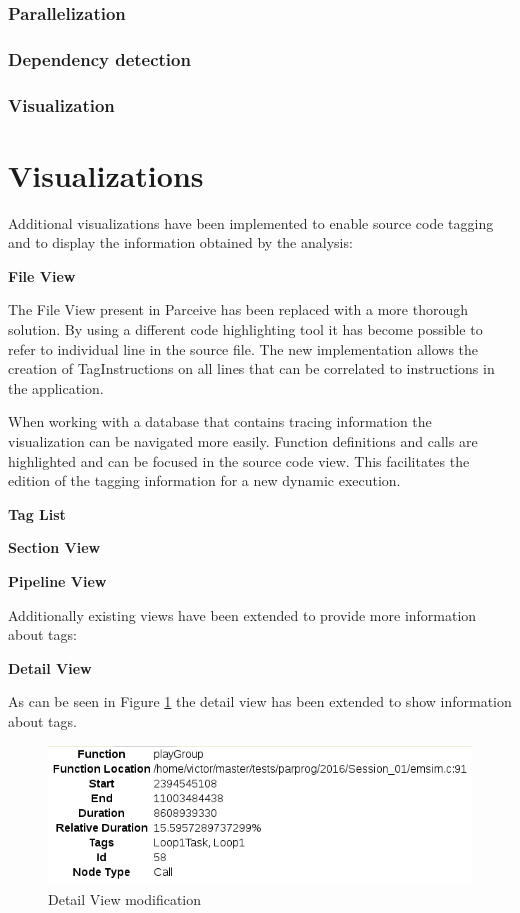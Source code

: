 \subsubsection{Parallelization}
\subsubsection{Dependency detection}
\subsubsection{Visualization}

\section{Visualizations}

Additional visualizations have been implemented to enable source code tagging and to display the information obtained by the analysis:

\textbf{File View}

The File View present in Parceive has been replaced with a more thorough solution. By using a different code highlighting tool \cite{googleprettify} it has become possible to refer to individual line in the source file. The new implementation allows the creation of TagInstructions on all lines that can be correlated to instructions in the application.

When working with a database that contains tracing information the visualization can be navigated more easily. Function definitions and calls are highlighted and can be focused in the source code view. This facilitates the edition of the tagging information for a new dynamic execution.

\textbf{Tag List}

\textbf{Section View}

\textbf{Pipeline View}

Additionally existing views have been extended to provide more information about tags:

\textbf{Detail View}

As can be seen in Figure \ref{cap3:detail} the detail view has been extended to show information about tags. 

\begin{figure}
	\centering
	\includegraphics[width=1\textwidth]{detail-mod}
	\caption{Detail View modification}
	\label{cap3:detail}
\end{figure}

